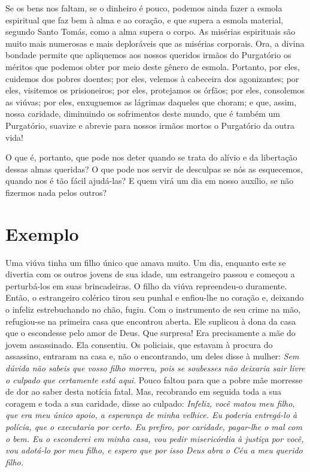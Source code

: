 Se os bens nos faltam, se o dinheiro é pouco, podemos ainda fazer a esmola espiritual que faz bem à alma e ao coração, e que supera a esmola material, segundo Santo Tomás, como a alma supera o corpo. As misérias espirituais são muito mais numerosas e mais deploráveis que as misérias corporais. Ora, a divina bondade permite que apliquemos aos nossos queridos irmãos do Purgatório os méritos que podemos obter por meio deste gênero de esmola. Portanto, por eles, cuidemos dos pobres doentes; por eles, velemos à cabeceira dos agonizantes; por eles, visitemos os prisioneiros; por eles, protejamos os órfãos; por eles, consolemos as viúvas; por eles, enxuguemos as lágrimas daqueles que choram; e que, assim, nossa caridade, diminuindo os sofrimentos deste mundo, que é também um Purgatório, suavize e abrevie para nossos irmãos mortos o Purgatório da outra vida!

O que é, portanto, que pode nos deter quando se trata do alívio e da libertação dessas almas queridas? O que pode nos servir de desculpas se nós as esquecemos, quando nos é tão fácil ajudá-las? E quem virá um dia em nosso auxílio, se não fizermos nada pelos outros?


\section*{Exemplo}

Uma viúva tinha um filho único que amava muito. Um dia, enquanto este se divertia com os outros jovens de sua idade, um estrangeiro passou e começou a perturbá-los em suas brincadeiras. O filho da viúva repreendeu-o duramente. Então, o estrangeiro colérico tirou seu punhal e enfiou-lhe no coração e, deixando o infeliz estrebuchando no chão, fugiu. Com o instrumento de seu crime na mão, refugiou-se na primeira casa que encontrou aberta. Ele suplicou à dona da casa que o escondesse pelo amor de Deus. Que surpresa! Era precisamente a mãe do jovem assassinado. Ela consentiu. Os policiais, que estavam à procura do assassino, entraram na casa e, não o encontrando, um deles disse à mulher: \textit{Sem dúvida não sabeis que vosso filho morreu, pois se soubesses não deixaria sair livre o culpado que certamente está aqui}. Pouco faltou para que a pobre mãe morresse de dor ao saber desta notícia fatal. Mas, recobrando em seguida toda a sua coragem e toda a sua caridade, disse ao culpado: \textit{Infeliz, você matou meu filho, que era meu único apoio, a esperança de minha velhice. Eu poderia entregá-lo à polícia, que o executaria por certo. Eu prefiro, por caridade, pagar-lhe o mal com o bem. Eu o esconderei em minha casa, vou pedir misericórdia à justiça por você, vou adotá-lo por meu filho, e espero que por isso Deus abra o Céu a meu querido filho.}


